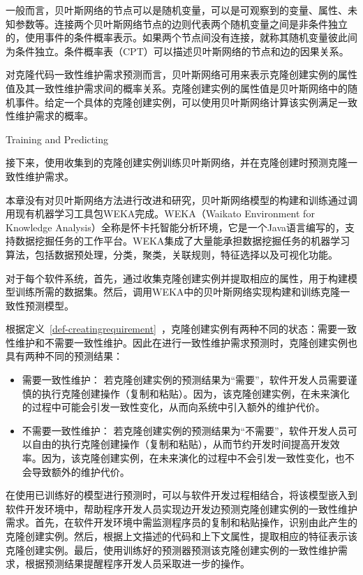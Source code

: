 一般而言，贝叶斯网络的节点可以是随机变量，可以是可观察到的变量、属性、未知参数等。连接两个贝叶斯网络节点的边则代表两个随机变量之间是非条件独立的，使用事件的条件概率表示。如果两个节点间没有连接，就称其随机变量彼此间为条件独立。条件概率表（CPT）可以描述贝叶斯网络的节点和边的因果关系。

对克隆代码一致性维护需求预测而言，贝叶斯网络可用来表示克隆创建实例的属性值及其一致性维护需求间的概率关系。克隆创建实例的属性值是贝叶斯网络中的随机事件。给定一个具体的克隆创建实例，可以使用贝叶斯网络计算该实例满足一致性维护需求的概率。

{Training and Predicting}

接下来，使用收集到的克隆创建实例训练贝叶斯网络，并在克隆创建时预测克隆一致性维护需求。

本章没有对贝叶斯网络方法进行改进和研究，贝叶斯网络模型的构建和训练通过调用现有机器学习工具包WEKA完成。WEKA（Waikato Environment for Knowledge Analysis）全称是怀卡托智能分析环境，它是一个Java语言编写的，支持数据挖掘任务的工作平台。WEKA集成了大量能承担数据挖掘任务的机器学习算法，包括数据预处理，分类，聚类，关联规则，特征选择以及可视化功能。

对于每个软件系统，首先，通过收集克隆创建实例并提取相应的属性，用于构建模型训练所需的数据集。然后，调用WEKA中的贝叶斯网络实现构建和训练克隆一致性预测模型。

根据定义~\ref{def-creatingrequirement}~，克隆创建实例有两种不同的状态：需要一致性维护和不需要一致性维护。因此在进行一致性维护需求预测时，克隆创建实例也具有两种不同的预测结果：
\begin{itemize}
\item 
需要一致性维护：
若克隆创建实例的预测结果为“需要”，软件开发人员需要谨慎的执行克隆创建操作（复制和粘贴）。因为，该克隆创建实例，在未来演化的过程中可能会引发一致性变化，从而向系统中引入额外的维护代价。
\item
不需要一致性维护：
若克隆创建实例的预测结果为“不需要”，软件开发人员可以自由的执行克隆创建操作（复制和粘贴），从而节约开发时间提高开发效率。因为，该克隆创建实例，在未来演化的过程中不会引发一致性变化，也不会导致额外的维护代价。
\end{itemize}

在使用已训练好的模型进行预测时，可以与软件开发过程相结合，将该模型嵌入到软件开发环境中，帮助程序开发人员实现边开发边预测克隆创建实例的一致性维护需求。首先，在软件开发环境中需监测程序员的复制和粘贴操作，识别由此产生的克隆创建实例。然后，根据上文描述的代码和上下文属性，提取相应的特征表示该克隆创建实例。最后，使用训练好的预测器预测该克隆创建实例的一致性维护需求，根据预测结果提醒程序开发人员采取进一步的操作。

